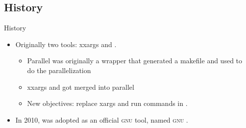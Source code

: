\subsection{History}
\begin{frame}{History}
   \begin{itemize}[<+(1)->]
      \itemsep10pt
      \item Originally two tools: xxargs and \LogoParallel. \begin{itemize}
         \itemsep5pt
         \item Parallel was originally a wrapper that generated a makefile and used  to do the parallelization
         \item xxargs and \LogoParallel got merged into parallel
         \item New objectives: replace xargs and run commands in \LogoParallel. 
      \end{itemize}
      \item In 2010, \LogoParallel was adopted as an official \textsc{gnu} tool, named \textsc{gnu} \LogoParallel.
   \end{itemize}
\end{frame}
\SidebarReset

